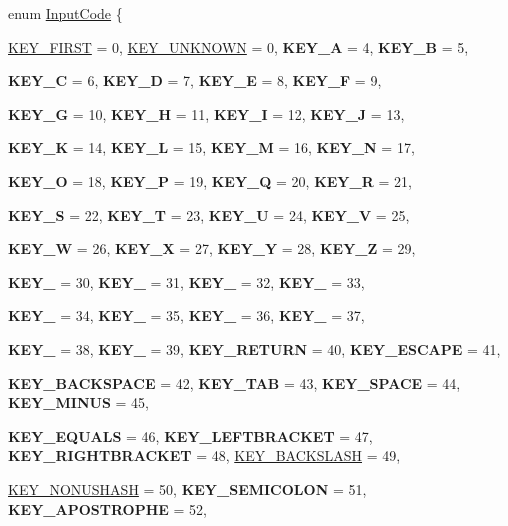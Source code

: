 \begin{DoxyCompactItemize}
enum \hyperlink{classphys_1_1MetaCode_a3e501cbb5bf0f6f1fdb7211465bda8d8}{InputCode} \{ \par
\hyperlink{classphys_1_1MetaCode_a3e501cbb5bf0f6f1fdb7211465bda8d8a45d7f3824a440f5bea5e616a6d6ea0b5}{KEY\_\-FIRST} =  0, 
\hyperlink{classphys_1_1MetaCode_a3e501cbb5bf0f6f1fdb7211465bda8d8a061a36c9b5d9661314fd9d276b33042f}{KEY\_\-UNKNOWN} =  0, 
{\bfseries KEY\_\-A} =  4, 
{\bfseries KEY\_\-B} =  5, 
\par
{\bfseries KEY\_\-C} =  6, 
{\bfseries KEY\_\-D} =  7, 
{\bfseries KEY\_\-E} =  8, 
{\bfseries KEY\_\-F} =  9, 
\par
{\bfseries KEY\_\-G} =  10, 
{\bfseries KEY\_\-H} =  11, 
{\bfseries KEY\_\-I} =  12, 
{\bfseries KEY\_\-J} =  13, 
\par
{\bfseries KEY\_\-K} =  14, 
{\bfseries KEY\_\-L} =  15, 
{\bfseries KEY\_\-M} =  16, 
{\bfseries KEY\_\-N} =  17, 
\par
{\bfseries KEY\_\-O} =  18, 
{\bfseries KEY\_\-P} =  19, 
{\bfseries KEY\_\-Q} =  20, 
{\bfseries KEY\_\-R} =  21, 
\par
{\bfseries KEY\_\-S} =  22, 
{\bfseries KEY\_\-T} =  23, 
{\bfseries KEY\_\-U} =  24, 
{\bfseries KEY\_\-V} =  25, 
\par
{\bfseries KEY\_\-W} =  26, 
{\bfseries KEY\_\-X} =  27, 
{\bfseries KEY\_\-Y} =  28, 
{\bfseries KEY\_\-Z} =  29, 
\par
{\bfseries KEY\_} =  30, 
{\bfseries KEY\_} =  31, 
{\bfseries KEY\_} =  32, 
{\bfseries KEY\_} =  33, 
\par
{\bfseries KEY\_} =  34, 
{\bfseries KEY\_} =  35, 
{\bfseries KEY\_} =  36, 
{\bfseries KEY\_} =  37, 
\par
{\bfseries KEY\_} =  38, 
{\bfseries KEY\_} =  39, 
{\bfseries KEY\_\-RETURN} =  40, 
{\bfseries KEY\_\-ESCAPE} =  41, 
\par
{\bfseries KEY\_\-BACKSPACE} =  42, 
{\bfseries KEY\_\-TAB} =  43, 
{\bfseries KEY\_\-SPACE} =  44, 
{\bfseries KEY\_\-MINUS} =  45, 
\par
{\bfseries KEY\_\-EQUALS} =  46, 
{\bfseries KEY\_\-LEFTBRACKET} =  47, 
{\bfseries KEY\_\-RIGHTBRACKET} =  48, 
\hyperlink{classphys_1_1MetaCode_a3e501cbb5bf0f6f1fdb7211465bda8d8acab0c272975d1667521cd5ae918e9b8e}{KEY\_\-BACKSLASH} =  49, 
\par
\hyperlink{classphys_1_1MetaCode_a3e501cbb5bf0f6f1fdb7211465bda8d8afd23349e045ee52f42e1c5c25ee3cec3}{KEY\_\-NONUSHASH} =  50, 
{\bfseries KEY\_\-SEMICOLON} =  51, 
{\bfseries KEY\_\-APOSTROPHE} =  52, 

\end{DoxyCompactItemize}
